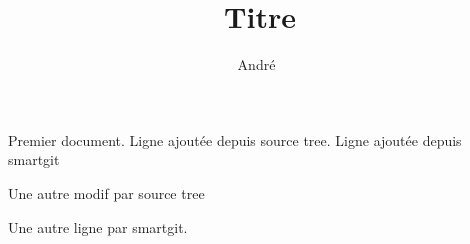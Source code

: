\documentclass[a4paper, french, 12pt]{article}
\title{Titre}
\author{André~\bsc{Dewèvre}}
\date{}
\begin{document}
\maketitle

Premier document.
Ligne ajoutée depuis source tree.
Ligne ajoutée depuis smartgit

Une autre modif par source tree

Une autre ligne par smartgit.
\end{document}
